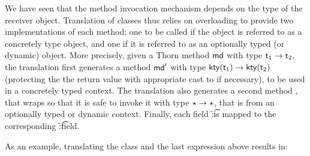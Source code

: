 \documentclass[acmlarge, anonymous, authordraft, review]{acmart} %
\begin{document}
We have seen that the method invocation mechanism depends on the type of the receiver object. Translation of classes thus relies on overloading to provide two implementations of each method: one to be called if the object is referred to as a concretely type object, and one if it is referred to as an optionally typed (or dynamic) object.  More precisely, given a Thorn method \(\md\) with type \(\t[1] \to \t[2]\), the \kafka translation first generates a method \(\mdp\) with type \(\kty{\t[1]} \to \kty{\t[2]}\) (protecting the the return value with appropriate cast to \kty{\t[2]} if necessary), to be used in a concretely typed context.  The \kafka translation also generates a second method \mdpp, that wraps \mdp so that it is safe to invoke it with type \(\star \to \star\), that is from an optionally typed or dynamic context.  Finally, each field \f:\t is mapped to the corresponding \f:\kty\t field.

%  
 
As an example, translating the class \A and the last expression above results in:
\end{document}
